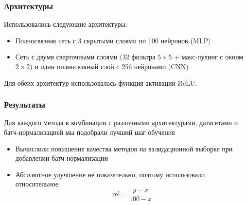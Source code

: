 \documentclass{beamer}
\begin{document}
\begin{frame}
\frametitle{Архитектуры}
Использовались следующие архитектуры:
\begin{itemize}
\item Полносвязная сеть с 3 скрытыми слоями по 100 нейронов (MLP)
\item Сеть с двумя сверточными слоями (32 фильтра $5 \times 5$ + макс-пулинг с окном $2\times 2$) и один полносвзяный слой c 256 нейронами (CNN)
\end{itemize}	

Для обеих архитектур использовалась функция активации ReLU.
\end{frame}

\begin{frame}
	\frametitle{Результаты}
	
Для каждого метода в комбинации с различными архитектурами, датасетами и батч-нормализацией мы подобрали лучший шаг обучения
\begin{itemize}
\item Вычислили повышение качества методов на валидационной выборке при добавлении батч-нормализации
\item Абсолютное улучшение не показательно, поэтому использовали относительное:
\begin{equation*}
\mathrm{rel} = \frac{y - x}{100 - x}
\end{equation*}
\end{itemize}

\end{frame}

\end{document}
